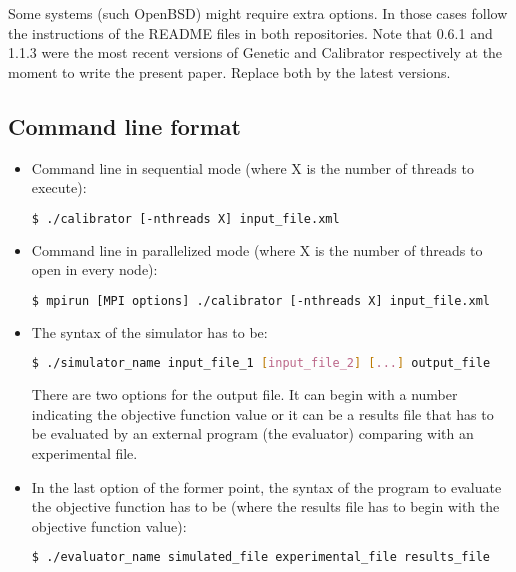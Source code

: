 \documentclass[review,authoryear]{elsarticle}
\begin{document}
Some systems (such OpenBSD) might require extra options. In those cases follow the instructions of the README files in both repositories.
Note that 0.6.1 and 1.1.3 were the most recent versions of Genetic and Calibrator respectively at the moment to write the present paper. Replace both by the latest versions.

\subsection{Command line format}

\begin{itemize}

\item Command line in sequential mode (where X is the number of threads to
execute):
\begin{lstlisting}[language=bash,basicstyle=\scriptsize]
$ ./calibrator [-nthreads X] input_file.xml
\end{lstlisting}

\item Command line in parallelized mode (where X is the number of threads to
open in every node):
\begin{lstlisting}[language=bash,basicstyle=\scriptsize]
$ mpirun [MPI options] ./calibrator [-nthreads X] input_file.xml
\end{lstlisting}

\item The syntax of the simulator has to be:
\begin{lstlisting}[language=bash,basicstyle=\scriptsize]
$ ./simulator_name input_file_1 [input_file_2] [...] output_file
\end{lstlisting}
There are two options for the output file. It can begin with a number indicating
the objective function value or it can be a results file that has to be
evaluated by an external program (the evaluator) comparing with an experimental
file.

\item In the last option of the former point, the syntax of the program to
evaluate the objective function has to be (where the results file has to begin
with the objective function value):
\begin{lstlisting}[language=bash,basicstyle=\scriptsize]
$ ./evaluator_name simulated_file experimental_file results_file
\end{lstlisting}

\end{itemize}
\end{document}
